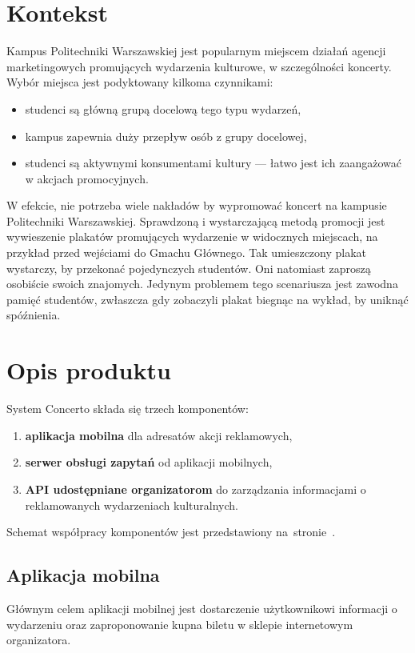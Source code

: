 \documentclass[10pt]{dokument-ppi}
\begin{document}
\MakeDokumentMeta


\section{Kontekst}

Kampus Politechniki Warszawskiej jest popularnym miejscem działań agencji
marketingowych promujących wydarzenia kulturowe, w szczególności koncerty. Wybór
miejsca jest podyktowany kilkoma czynnikami:
\begin{itemize}
    \item studenci są główną grupą docelową tego typu wydarzeń,
    \item kampus zapewnia duży przepływ osób z grupy docelowej,
    \item studenci są aktywnymi konsumentami kultury --- łatwo jest ich
        zaangażować w akcjach promocyjnych.
\end{itemize}
W efekcie, nie potrzeba wiele nakładów by wypromować koncert na kampusie
Politechniki Warszawskiej. Sprawdzoną i wystarczającą metodą promocji jest
wywieszenie plakatów promujących wydarzenie w widocznych miejscach, na przykład
przed wejściami do Gmachu Głównego. Tak umieszczony plakat wystarczy, by
przekonać pojedynczych studentów. Oni natomiast zaproszą osobiście swoich
znajomych. Jedynym problemem tego scenariusza jest zawodna pamięć studentów,
zwłaszcza gdy zobaczyli plakat biegnąc na wykład, by uniknąć spóźnienia.


\section{Opis produktu}

System Concerto składa się trzech komponentów:
\begin{enumerate}
    \item \textbf{aplikacja mobilna} dla adresatów akcji reklamowych,
    \item \textbf{serwer obsługi zapytań} od aplikacji mobilnych,
    \item \textbf{API udostępniane organizatorom} do zarządzania informacjami o
        reklamowanych wydarzeniach kulturalnych.
\end{enumerate}
Schemat współpracy komponentów jest przedstawiony
na~stronie~\pageref{fig:schemat_komponentow}.

\subsection{Aplikacja mobilna}
Głównym celem aplikacji mobilnej jest dostarczenie użytkownikowi informacji o
wydarzeniu oraz zaproponowanie kupna biletu w sklepie internetowym organizatora.
\end{document}

